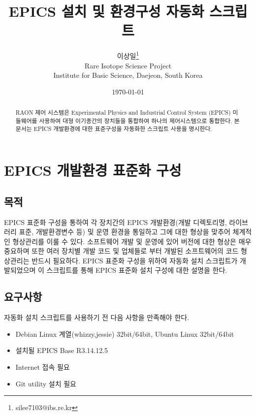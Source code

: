 \documentclass[11pt
  , a4paper
  , article
  , oneside
]{memoir}
\begin{document}
\newcommand{\technumber}{
  RAON Control-Document Series\\
  Revision : v1.0,   Release : 2015-10-29 fixed date}
\title{\textbf{EPICS 설치 및 환경구성 자동화 스크립트}}

\author{이상일\thanks{silee7103@ibs.re.kr}\\
  Rare Isotope Science Project\\
  Institute for Basic Science, Daejeon, South Korea
}
\date{\today}

\renewcommand{\maketitlehooka}{\begin{flushright}\textsf{\technumber}\end{flushright}}

\maketitle

\begin{abstract}
RAON 제어 시스템은 Experimental Physics and Industrial Control System (EPICS)\cite{epics} 미들웨어를 사용하여 대형 이기종간의 장치들을 통합하여 하나의 제어시스템으로 통합한다. 본 문서는 EPICS 개발환경에 대한 표준구성을 자동화한 스크립트 사용을 명시한다. 
\end{abstract}

\hfil\break
\hfil\break
\hfil\break
\hfil\break
\chapter{EPICS 개발환경 표준화 구성}
\section{목적}
EPICS 표준화 구성을 통하여 각 장치간의 EPICS 개발환경(개발 디렉토리명, 라이브러리 표준, 개발환경변수 등) 및 운영 환경을 통일하고 그에 대한 형상을 맞추어 체계적인 형상관리를 이룰 수 있다. 소프트웨어 개발 및 운영에 있어 버전에 대한 형상은 매우 중요하며 또한 여러 장치별 개발 코드 및 업체들로 부터 개발된 소프트웨어의 코드 형상관리는 반드시 필요하다. EPICS 표준화 구성을 위하여 자동화 설치 스크립트가 개발되었으며 이 스크립트를 통해 EPICS 표준화 설치 구성에 대한 설명을 한다.


\section{요구사항}
자동화 설치 스크립트를 사용하기 전 다음 사항을 만족해야 한다.
\begin{itemize}
	\item Debian Linux 계열(whizzy,jessie) 32bit/64bit, Ubuntu Linux 32bit/64bit
	\item 설치될 EPICS Base R3.14.12.5
	\item Internet 접속 필요
	\item Git utility 설치 필요
\end{itemize}
\end{document}

